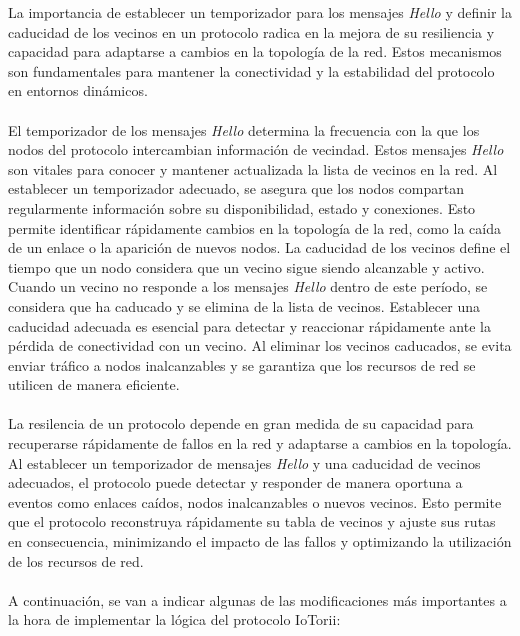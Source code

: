 La importancia de establecer un temporizador para los mensajes \textit{Hello} y definir la caducidad de los vecinos en un protocolo radica en la mejora de su resiliencia y capacidad para adaptarse a cambios en la topología de la red. Estos mecanismos son fundamentales para mantener la conectividad y la estabilidad del protocolo en entornos dinámicos.\\
\\
El temporizador de los mensajes \textit{Hello} determina la frecuencia con la que los nodos del protocolo intercambian información de vecindad. Estos mensajes \textit{Hello} son vitales para conocer y mantener actualizada la lista de vecinos en la red. Al establecer un temporizador adecuado, se asegura que los nodos compartan regularmente información sobre su disponibilidad, estado y conexiones. Esto permite identificar rápidamente cambios en la topología de la red, como la caída de un enlace o la aparición de nuevos nodos. La caducidad de los vecinos define el tiempo que un nodo considera que un vecino sigue siendo alcanzable y activo. Cuando un vecino no responde a los mensajes \textit{Hello} dentro de este período, se considera que ha caducado y se elimina de la lista de vecinos. Establecer una caducidad adecuada es esencial para detectar y reaccionar rápidamente ante la pérdida de conectividad con un vecino. Al eliminar los vecinos caducados, se evita enviar tráfico a nodos inalcanzables y se garantiza que los recursos de red se utilicen de manera eficiente.\\
\\
La resilencia de un protocolo depende en gran medida de su capacidad para recuperarse rápidamente de fallos en la red y adaptarse a cambios en la topología. Al establecer un temporizador de mensajes \textit{Hello} y una caducidad de vecinos adecuados, el protocolo puede detectar y responder de manera oportuna a eventos como enlaces caídos, nodos inalcanzables o nuevos vecinos. Esto permite que el protocolo reconstruya rápidamente su tabla de vecinos y ajuste sus rutas en consecuencia, minimizando el impacto de las fallos y optimizando la utilización de los recursos de red.\\
\\
A continuación, se van a indicar algunas de las modificaciones más importantes a la hora de implementar la lógica del protocolo IoTorii:

